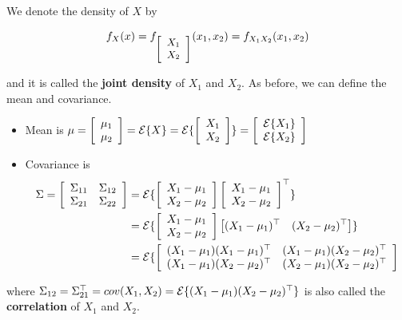 \begin{notation} We denote the density of $X$ by

$$f_X(x)=f_{\small \left[ \begin{array}{cc} X_1 \\
                                               X_2 \end{array} \right]}(x_1,x_2)=f_{X_1 X_2}(x_1,x_2) $$

and it is called the \textbf{joint density} of $X_1$ and $X_2$. As before, we can define the mean and covariance.
\begin{itemize}

 \item Mean is $\mu=
        \left[ \begin{array}{ccc}\mu_1\\ \mu_2 \end{array} \right]= \mathcal{E}\{X\}=\mathcal{E}\{\left[ \begin{array}{ccc}X_1\\ X_2\end{array} \right]\}=\left[ \begin{array}{ccc}\mathcal{E} \{X_1\}\\ \mathcal{E}\{X_2\}\end{array} \right]$

 \item Covariance is \begin{align*} \Sigma =    \left[ \begin{array}{cc}\Sigma_{11} & \Sigma_{12}\\ \Sigma_{21} & \Sigma_{22}\end{array} \right] &= \mathcal{E}\{\left[ \begin{array}{c}X_1-\mu_1\\ X_2-\mu_2\end{array} \right] \left[ \begin{array}{c}X_1-\mu_1\\ X_2-\mu_2\end{array} \right]^\top\}  \\
     &= \mathcal{E}\{\left[ \begin{array}{c}X_1-\mu_1\\ X_2-\mu_2\end{array} \right] \left[ (X_1-\mu_1)^\top~~~ (X_2-\mu_2)^\top  \right] \} \\
     &= \mathcal{E}\{\left[ \begin{array}{cc}(X_1-\mu_1)(X_1-\mu_1)^\top &(X_1-\mu_1)(X_2-\mu_2)^\top \\
     (X_1-\mu_1)(X_2-\mu_2)^\top &(X_2-\mu_1)(X_2-\mu_2)^\top
     \end{array} \right]
     \end{align*}
 \end{itemize}
 where $\Sigma_{12}=\Sigma_{21}^\top = cov(X_1,X_2)=\mathcal{E}\{ (X_1-\mu_1)(X_2-\mu_2)^\top  \}$ is also called the \textbf{correlation} of $X_1$ and $X_2$.

\end{notation}

